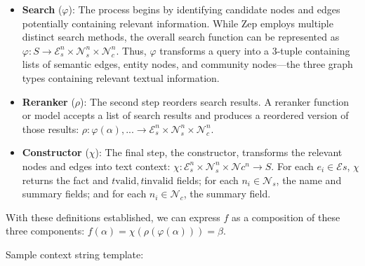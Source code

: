 \documentclass{article}
\begin{document}
\begin{itemize}
\item \textbf{Search} ($\varphi$): The process begins by identifying candidate nodes and edges potentially containing relevant information. While Zep employs multiple distinct search methods, the overall search function can be represented as $\varphi: S\to\mathcal{E}_s^n\times\mathcal{N}_s^n\times\mathcal{N}_c^n$. Thus, $\varphi$ transforms a query into a 3-tuple containing lists of semantic edges, entity nodes, and community nodes—the three graph types containing relevant textual information.
\item \textbf{Reranker} ($\rho$): The second step reorders search results. A reranker function or model accepts a list of search results and produces a reordered version of those results: $\rho: {\varphi(\alpha),...}\to\mathcal{E}_s^n\times\mathcal{N}_s^n\times\mathcal{N}_c^n$.
\item \textbf{Constructor} ($\chi$): The final step, the constructor, transforms the relevant nodes and edges into text context: $\chi: \mathcal{E}_s^n\times\mathcal{N}_s^n\times\mathcal{N}c^n\to S$. For each $e_i\in\mathcal{E}s$, $\chi$ returns the fact and $t\text{valid},t\text{invalid}$ fields; for each $n_i\in\mathcal{N}_s$, the name and summary fields; and for each $n_i\in\mathcal{N}_c$, the summary field.
\end{itemize}
With these definitions established, we can express $f$ as a composition of these three components: $f(\alpha)=\chi(\rho(\varphi(\alpha)))=\beta$.

Sample context string template:

\noindent{}
\end{document}

